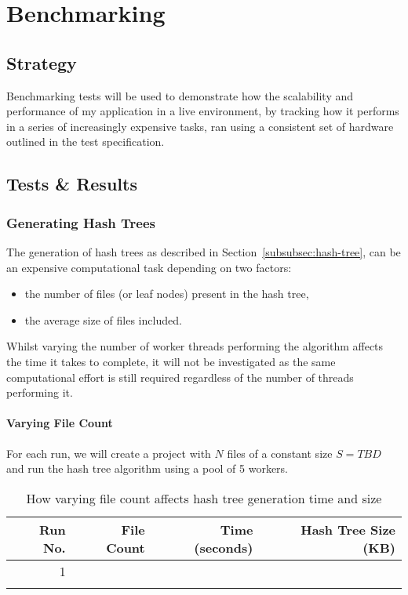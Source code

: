 \section{Benchmarking}

\subsection*{Strategy}

Benchmarking tests will be used to demonstrate how the scalability and performance of my application in a live environment, by tracking how it performs in a series of increasingly expensive tasks, ran using a consistent set of hardware outlined in the test specification.

\subsection*{Tests \& Results}

\subsubsection*{Generating Hash Trees}

The generation of hash trees as described in Section~\ref{subsubsec:hash-tree}, can be an expensive computational task depending on two factors:

\begin{itemize}
  \item the number of files (or leaf nodes) present in the hash tree,
  \item the average size of files included.
\end{itemize}

\vspace{1mm}\noindent
Whilst varying the number of worker threads performing the algorithm affects the time it takes to complete, it will not be investigated as the same computational effort is still required regardless of the number of threads performing it.

\paragraph*{Varying File Count}
For each run, we will create a project with $N$ files of a constant size $S=TBD$ and run the hash tree algorithm using a pool of 5 workers.

\begin{longtable}{ | r | r | r | r | }
  \hline
  \textbf{Run No.} & \textbf{File Count} & \textbf{Time (seconds)} & \textbf{Hash Tree Size (KB)}\\\hline
  1
  &
  &
  &
  \\\hline
  \caption{How varying file count affects hash tree generation time and size}
\end{longtable}

